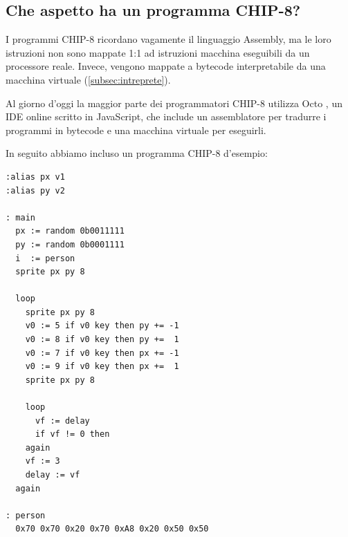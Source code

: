 \documentclass[a4paper]{article}
\begin{document}
\begin{appendices}
\section{Che aspetto ha un programma CHIP-8?}

I programmi CHIP-8 ricordano vagamente il linguaggio Assembly, ma le loro istruzioni non
sono mappate 1:1 ad istruzioni macchina eseguibili da un processore reale. Invece, vengono
mappate a bytecode interpretabile da una macchina virtuale (\ref{subsec:intreprete}).

Al giorno d'oggi la maggior parte dei programmatori CHIP-8 utilizza Octo \cite{chip8:octo}, un IDE
online scritto in JavaScript, che include un assemblatore per tradurre i programmi in bytecode
e una macchina virtuale per eseguirli.

In seguito abbiamo incluso un programma CHIP-8 d'esempio:

\begin{lstlisting}[language=CHIP8]
:alias px v1
:alias py v2

: main
  px := random 0b0011111
  py := random 0b0001111
  i  := person
  sprite px py 8

  loop
    sprite px py 8
    v0 := 5 if v0 key then py += -1
    v0 := 8 if v0 key then py +=  1
    v0 := 7 if v0 key then px += -1
    v0 := 9 if v0 key then px +=  1
    sprite px py 8

    loop
      vf := delay
      if vf != 0 then
    again
    vf := 3
    delay := vf
  again

: person
  0x70 0x70 0x20 0x70 0xA8 0x20 0x50 0x50
\end{lstlisting}

\end{appendices}
\end{document}
